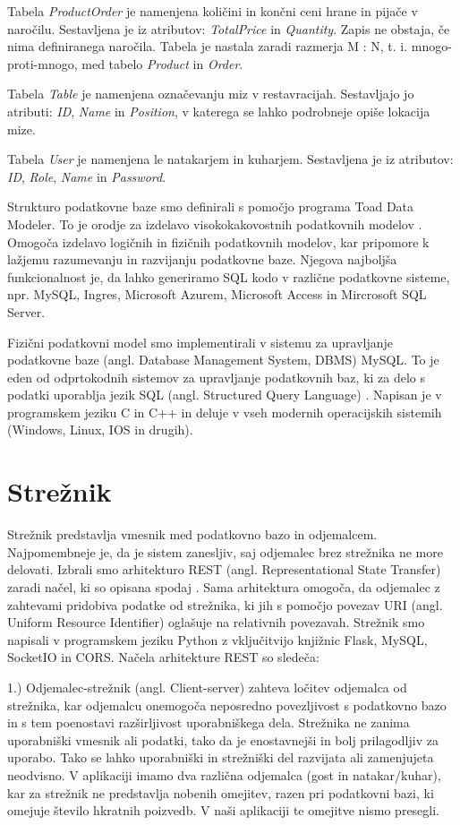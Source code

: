 \documentclass[a4paper, 12pt]{book}
\begin{document}
Tabela \textit{ProductOrder} je namenjena količini in končni ceni hrane in pijače v naročilu. Sestavljena je iz atributov: \textit{TotalPrice} in \textit{Quantity}. Zapis ne obstaja, če nima definiranega naročila. Tabela je nastala zaradi razmerja M : N, t. i. mnogo-proti-mnogo, med tabelo \textit{Product} in \textit{Order}.

Tabela \textit{Table} je namenjena označevanju miz v restavracijah. Sestavljajo jo atributi: \textit{ID}, \textit{Name} in \textit{Position}, v katerega se lahko podrobneje opiše lokacija mize.

Tabela \textit{User} je namenjena le natakarjem in kuharjem. Sestavljena je iz atributov: \textit{ID}, \textit{Role}, \textit{Name} in \textit{Password}. 

Strukturo podatkovne baze smo definirali s pomočjo programa Toad Data Modeler. To je orodje za izdelavo visokokakovostnih podatkovnih modelov \cite{Toad_Data_Modeler}. Omogoča izdelavo logičnih in fizičnih podatkovnih modelov, kar pripomore k lažjemu razumevanju in razvijanju podatkovne baze. Njegova najboljša funkcionalnost je, da lahko generiramo SQL kodo v različne podatkovne sisteme, npr. MySQL, Ingres, Microsoft Azurem, Microsoft Access in Mircrosoft SQL Server.

Fizični podatkovni model smo implementirali v sistemu za upravljanje podatkovne baze (angl. Database Management System, DBMS) MySQL. To je eden od odprtokodnih sistemov za upravljanje podatkovnih baz, ki za delo s podatki uporablja jezik SQL (angl. Structured Query Language) \cite{MySQL}. Napisan je v programskem jeziku C in C++ in deluje v vseh modernih operacijskih sistemih (Windows, Linux, IOS in drugih).


\section{Strežnik}
Strežnik predstavlja vmesnik med podatkovno bazo in odjemalcem. Najpomembneje je, da je sistem zanesljiv, saj odjemalec brez strežnika ne more delovati. Izbrali smo arhitekturo REST (angl. Representational State Transfer) zaradi načel, ki so opisana spodaj \cite{RESTAPI}. Sama arhitektura omogoča, da odjemalec z zahtevami pridobiva podatke od strežnika, ki jih s pomočjo povezav URI (angl. Uniform Resource Identifier) oglašuje na relativnih povezavah. Strežnik smo napisali v programskem jeziku Python z vključitvijo knjižnic Flask, MySQL, SocketIO in CORS. Načela arhitekture REST so sledeča:

1.) Odjemalec-strežnik (angl. Client-server) zahteva ločitev odjemalca od strežnika, kar odjemalcu onemogoča neposredno povezljivost s podatkovno bazo in s tem poenostavi razširljivost uporabniškega dela. Strežnika ne zanima uporabniški vmesnik ali podatki, tako da je enostavnejši in bolj prilagodljiv za uporabo. Tako se lahko uporabniški in strežniški del razvijata ali zamenjujeta neodvisno. V aplikaciji imamo dva različna odjemalca (gost in natakar/kuhar), kar za strežnik ne predstavlja nobenih omejitev, razen pri podatkovni bazi, ki omejuje število hkratnih poizvedb. V naši aplikaciji te omejitve nismo presegli.
\end{document}
